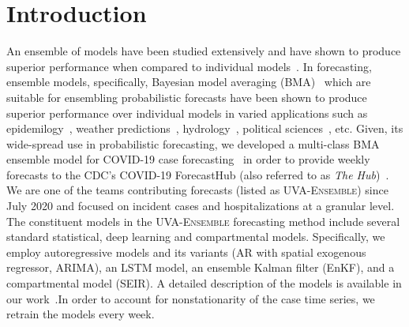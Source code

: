 \documentclass[conference,compsoc]{IEEEtran}
\newcommand{\hub}{\emph{The Hub}}
\begin{document}
\section{Introduction}
An ensemble of models have been studied extensively and have shown to produce superior performance when compared to individual models~\cite{sagi2018ensemble}. In forecasting, ensemble models, specifically, Bayesian model averaging (BMA)~\cite{raftery2005using} which are suitable for ensembling probabilistic forecasts have been shown to produce superior performance over individual models in varied applications such as  epidemilogy~\cite{yamana2016superensemble,reich2019collaborative,cramer2022evaluation}, weather predictions~\cite{raftery2005using}, hydrology~\cite{duan2007multi}, political sciences~\cite{montgomery2012improving}, etc. Given, its wide-spread use in probabilistic forecasting, we developed a multi-class BMA ensemble model for COVID-19 case forecasting~\cite{allmodels} in order to provide weekly forecasts to the CDC's COVID-19 ForecastHub (also referred to as \hub{})~\cite{Cramer2021-hub-dataset}. We are one of
the teams contributing forecasts (listed as \textsc{UVA-Ensemble}) since July 2020 and focused on incident cases and hospitalizations at a granular level. The constituent models in the \textsc{UVA-Ensemble} forecasting method include several standard statistical, deep learning and compartmental models. Specifically, we employ autoregressive models and its variants (AR with spatial exogenous regressor, ARIMA), an LSTM model, an ensemble Kalman filter (EnKF), and a compartmental model (SEIR). A detailed description of the models is available in our work~\cite{allmodels}.In order to account for nonstationarity of the case time series, we retrain the models every week.  
\end{document}
